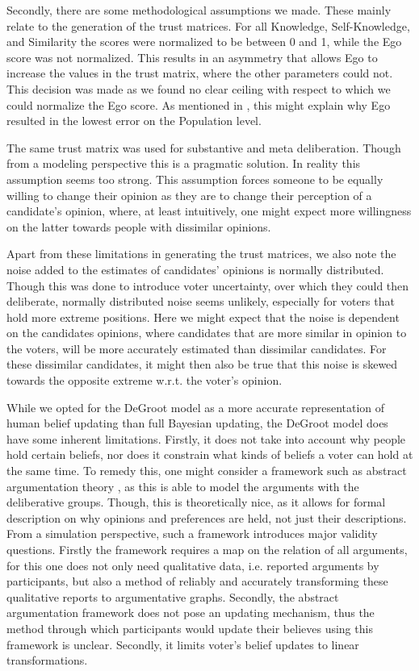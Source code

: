 Secondly, there are some methodological assumptions we made. These mainly
relate to the generation of the trust matrices. For all Knowledge,
Self-Knowledge, and Similarity the scores were normalized to be between 0 and
1, while the Ego score was not normalized. This results in an asymmetry that
allows Ego to increase the values in the trust matrix, where the other
parameters could not. This decision was made as we found no clear ceiling
with respect to which we could normalize the Ego score. As mentioned in ,
this might explain why Ego resulted in the lowest error on the Population level.

The same trust matrix was used for substantive and meta deliberation. Though
from a modeling perspective this is a pragmatic solution. In reality this
assumption seems too strong. This assumption forces someone to be equally
willing to change their opinion as they are to change their perception of a
candidate's opinion, where, at least intuitively, one might expect more
willingness on the latter towards people with dissimilar opinions.


Apart from these limitations in generating the trust matrices, we also note the
noise added to the estimates of candidates' opinions is normally distributed.
Though this was done to introduce voter uncertainty, over which they could then
deliberate, normally distributed noise seems unlikely, especially for voters
that hold more extreme positions. Here we might expect that the noise is
dependent on the candidates opinions, where candidates that are more similar in
opinion to the voters, will be more accurately estimated than dissimilar
candidates. For these dissimilar candidates, it might then also be true that
this noise is skewed towards the opposite extreme w.r.t. the voter's opinion.

While we opted for the DeGroot model as a more accurate representation of human
belief updating than full Bayesian updating, the DeGroot model does have some
inherent limitations. Firstly, it does not take into account why people hold
certain beliefs, nor does it constrain what kinds of beliefs a voter can hold
at the same time. To remedy this, one might consider a framework such as
abstract argumentation theory \cite{dungAcceptabilityArgumentsIts1995}, as
this is able to model the arguments with the deliberative groups. Though, this
is theoretically nice, as it allows for formal description on why opinions and
preferences are held, not just their descriptions. From a simulation
perspective, such a framework introduces major validity questions. Firstly the
framework requires a map on the relation of all arguments, for this one does
not only need qualitative data, i.e. reported arguments by participants, but
also a method of reliably and accurately transforming these qualitative reports
to argumentative graphs. Secondly, the abstract argumentation framework does
not pose an updating mechanism, thus the method through which participants
would update their believes using this framework is unclear. Secondly, it limits
voter's belief updates to linear transformations.


